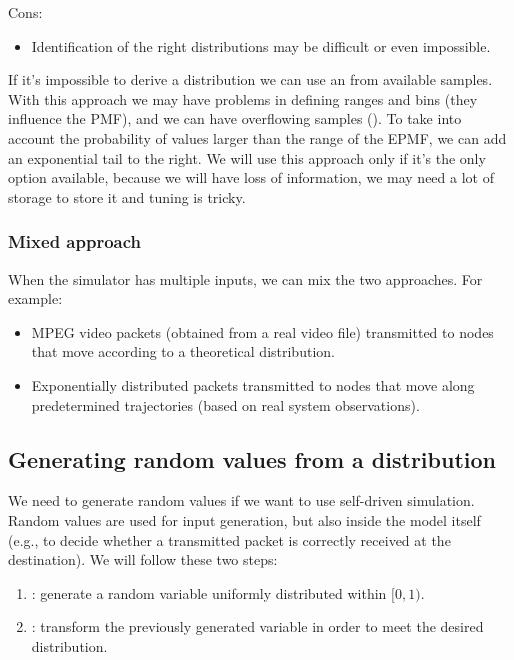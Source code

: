 Cons:
\begin{itemize}
\item Identification of the right distributions may be difficult or even impossible.
\end{itemize}

If it's impossible to derive a distribution we can use an  from available samples. With this approach we may have problems in defining ranges and bins (they influence the PMF), and we can have overflowing samples (). To take into account the probability of values larger than the range of the EPMF, we can add an exponential tail to the right. We will use this approach only if it's the only option available, because we will have loss of information, we may need a lot of storage to store it and tuning is tricky.

\subsubsection{Mixed approach}
When the simulator has multiple inputs, we can mix the two approaches. For example:
\begin{itemize}
\item MPEG video packets (obtained from a real video file) transmitted to nodes that move according to a theoretical distribution.
\item Exponentially distributed packets transmitted to nodes that move along predetermined trajectories (based on real system observations).
\end{itemize}

\subsection{Generating random values from a distribution}

We need to generate random values if we want to use self-driven simulation. Random values are used for input generation, but also inside the model itself (e.g., to decide whether a transmitted packet is correctly received at the destination). We will follow these two steps:
\begin{enumerate}
\item {}: generate a random variable uniformly distributed within $[0,1)$.
\item {}: transform the previously generated variable in order to meet the desired distribution.
\end{enumerate}

